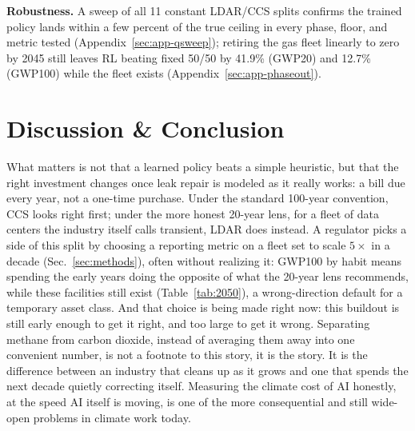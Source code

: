 \documentclass{article}
\begin{document}
\textbf{Robustness.} A sweep of all 11 constant LDAR/CCS splits confirms
the trained policy lands within a few percent of the true ceiling in
every phase, floor, and metric tested (Appendix~\ref{sec:app-qsweep});
retiring the gas fleet linearly to zero by 2045 still leaves RL beating
fixed 50/50 by 41.9\% (GWP20) and 12.7\% (GWP100) while the fleet exists
(Appendix~\ref{sec:app-phaseout}).

\section{Discussion \& Conclusion}

What matters is not that a learned policy beats a simple heuristic, but
that the right investment changes once leak repair is modeled as it
really works: a bill due every year, not a one-time purchase. Under the
standard 100-year convention, CCS looks right first; under the more
honest 20-year lens, for a fleet of data centers the industry itself
calls transient, LDAR does instead. A regulator picks a side of this
split by choosing a reporting metric on a fleet set to scale $5\times$
in a decade (Sec.~\ref{sec:methods}), often without realizing it:
GWP100 by habit means spending the early years doing the opposite of
what the 20-year lens recommends, while these facilities still exist
(Table~\ref{tab:2050}), a wrong-direction default for a temporary asset
class. And
that choice is being made right now: this buildout is still early
enough to get it right, and too large to get it wrong. Separating
methane from carbon dioxide, instead of averaging them away into one
convenient number, is not a footnote to this story, it is the story. It
is the difference between an industry that cleans up as it grows and
one that spends the next decade quietly correcting itself. Measuring
the climate cost of AI honestly, at the speed AI itself is moving, is
one of the more consequential and still wide-open problems in climate
work today.




\appendix
\end{document}
